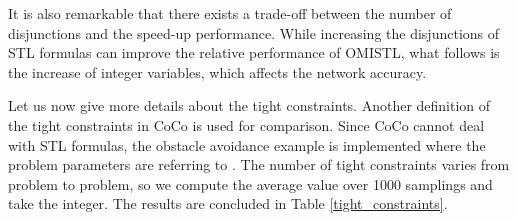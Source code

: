 \documentclass[a4paper]{report}
\begin{document}
It is also remarkable that there exists a trade-off between the number of disjunctions and the speed-up performance. While increasing the disjunctions of STL formulas can improve the relative performance of OMISTL, what follows is the increase of integer variables, which affects the network accuracy.


\begin{table}[!htbp]
    \caption[]{Comparison for three specifications}\label{benchmark_comparison}
    \end{table}
    Let us now give more details about the tight constraints. Another definition of the tight constraints in CoCo is used for comparison. Since CoCo cannot deal with STL formulas, the obstacle avoidance example is implemented where the problem parameters are referring to \cite[]{Cauligi2020}. The number of tight constraints varies from problem to problem, so we compute the average value over 1000 samplings and take the integer. The results are concluded in Table \ref*{tight_constraints}.
\end{document}
